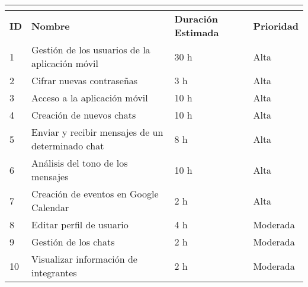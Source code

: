 \begin{tabular}{|l|l|l|l|}
	\hline
	\multicolumn{4}{|c|}{\cellcolor[HTML]{343434}{\color[HTML]{FFFFFF} \textbf{Pila de Producto}}} \\ \hline
	\textbf{ID}              & \textbf{Nombre}              & \textbf{Duración Estimada}             & \textbf{Prioridad}             \\ \hline
	1               &  Gestión de los usuarios de la aplicación móvil                   & 30 h                              & Alta                      \\ \hline
	2               & Cifrar nuevas contraseñas                    & 3 h                               & Alta                      \\ \hline
	3               & Acceso a la aplicación móvil                    & 10 h                               & Alta                      \\ \hline
	4               & Creación de nuevos chats   & 10 h            & Alta                      \\ \hline
	5               & Enviar y recibir mensajes de un determinado chat                    & 8 h                     & Alta                      \\ \hline
	6               & Análisis del tono de los mensajes                    & 10 h                               & Alta                      \\ \hline
	7               & Creación de eventos en Google Calendar                    & 2 h                               & Alta                  \\ \hline
	8               & Editar perfil de usuario                    & 4 h                               & Moderada                      \\ \hline
	9               & Gestión de los chats                    & 2 h                               & Moderada                      \\ \hline
	10               & Visualizar información de integrantes                    & 2 h                               & Moderada                      \\ \hline
\end{tabular}